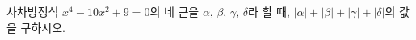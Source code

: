 사차방정식 $x^4-10x^2+9=0$의 네 근을 $\alpha$, $\beta$, $\gamma$, $\delta$라 할 때, $|\alpha|+|\beta|+|\gamma|+|\delta|$의 값을 구하시오.
